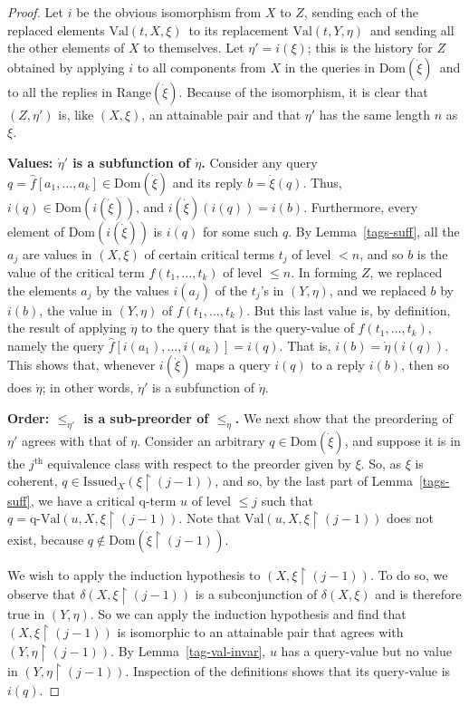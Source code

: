 \documentclass{LMCS}
\theoremstyle{definition}
\newcommand{\Issued}{\text{Issued}}
\newcommand{\ans}{\dot}
\newcommand{\dom}[1]{\ensuremath{{\text{Dom}}(#1)}}
\newcommand{\qval}[3]{\ensuremath{\text{q-Val}(#1,#2,#3)}}
\newcommand{\ran}[1]{\ensuremath{{\text{Range}}(#1)}}
\newcommand{\restr}{\mathop{\upharpoonright}}
\newcommand{\val}[3]{\ensuremath{\text{Val}(#1,#2,#3)}}
\renewcommand{\th}{\ensuremath{{}^{\text{th}}}}
\begin{document}
\begin{proof}
Let $i$ be the obvious isomorphism from $X$ to $Z$, sending each of
the replaced elements \val tX\xi\ to its replacement \val tY\eta\ and
sending all the other elements of $X$ to themselves.  Let
$\eta'=i(\xi)$; this is the history for $Z$ obtained by applying $i$ to
all components from $X$ in the queries in \dom{\ans\xi}\ and to all the
replies in \ran{\ans\xi}.  Because of the isomorphism, it is clear
that $(Z,\eta')$ is, like $(X,\xi)$, an attainable pair and that
$\eta'$ has the same length $n$ as $\xi$.

\medskip\noindent\textbf{Values: $\dot\eta'$ is a subfunction of $\dot
\eta$.}  Consider any query $q=\hat f[a_1,\dots,a_k]\in\dom{\ans\xi}$
and its reply $b=\ans\xi(q)$.  Thus, $i(q)\in \dom{i(\ans\xi)}$, and
$i(\ans\xi)(i(q))=i(b)$.  Furthermore, every element of
\dom{i(\ans\xi)} is $i(q)$ for some such $q$.  By
Lemma~\ref{tags-suff}, all the $a_j$ are values in $(X,\xi)$ of
certain critical terms $t_j$ of level $<n$, and so $b$ is the value of
the critical term $f(t_1,\dots,t_k)$ of level $\leq n$.  In forming
$Z$, we replaced the elements $a_j$ by the values $i(a_j)$ of the
$t_j$'s in $(Y,\eta)$, and we replaced $b$ by $i(b)$, the value in
$(Y,\eta)$ of $f(t_1,\dots,t_k)$.  But this last value is, by
definition, the result of applying $\ans\eta$ to the query that is the
query-value of $f(t_1,\dots,t_k)$, namely the query $\hat
f[i(a_1),\dots,i(a_k)]=i(q)$.  That is, $i(b)=\ans\eta(i(q))$.  This
shows that, whenever $i(\ans\xi)$ maps a query $i(q)$ to a reply
$i(b)$, then so does $\ans\eta$; in other words, $\ans\eta'$ is a
subfunction of $\ans\eta$.

\medskip\noindent\textbf{Order: $\le_{\eta'}$ is a sub-preorder of
$\le_\eta$.} We next show that the preordering of $\eta'$ agrees with
that of $\eta$.  Consider an arbitrary $q\in\dom{\ans\xi}$, and
suppose it is in the $j\th$ equivalence class with respect to the
preorder given by $\xi$.  So, as $\xi$ is coherent,
$q\in\Issued_X(\xi\restr(j-1))$, and so, by the last part of
Lemma~\ref{tags-suff}, we have a critical q-term $u$ of level $\leq j$
such that $q=\qval uX{\xi\restr(j-1)}$.  Note that \val
uX{\xi\restr(j-1)} does not exist, because
$q\notin\dom{\ans\xi\restr(j-1)}$.

We wish to apply the induction hypothesis to $(X,\xi\restr(j-1))$.  To
do so, we observe that $\delta(X,\xi\restr(j-1))$ is a subconjunction
of $\delta(X,\xi)$ and is therefore true in $(Y,\eta)$.  So we can
apply the induction hypothesis and find that $(X,\xi\restr(j-1))$ is
isomorphic to an attainable pair that agrees with
$(Y,\eta\restr(j-1))$.  By Lemma~\ref{tag-val-invar}, $u$ has a
query-value but no value in $(Y,\eta\restr(j-1))$.  Inspection of the
definitions shows that its query-value is $i(q)$.


\end{proof}
\end{document}
